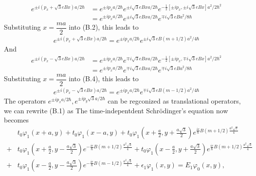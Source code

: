 \documentclass{report}
\newcommand{\f}[2]{\dfrac{#1}{#2}}
\begin{document}
\begin{equation}
	\begin{aligned}
		e^{\pm i(p_{x} + \sqrt{3} e B x) a / 2\hbar}
		 & = e^{\pm i p_{x} a / 2 \hbar} e^{\pm i\sqrt{3} e B x a / 2 \hbar} e^{-\frac{1}{2} \left[\pm i p_{x}, \pm i \sqrt{3} e B x\right] a^{2} / 2 \hbar^{2}} \\
		 & = e^{\pm i p_{x} a / 2 \hbar} e^{\pm i\sqrt{3} e B x a / 2 \hbar} e^{\mp i \sqrt{3} e B a^{2} / 8 \hbar}
	\end{aligned}
\end{equation}
Substituting $x = \f{ma}{2}$ into (B.2), this leads to
\begin{gather}
	e^{\pm i(p_{x} + \sqrt{3} e B x) a / 2\hbar}
	= e^{\pm i p_{x} a / 2 \hbar} e^{\pm i\sqrt{3} e B (m + 1 /2) a^{2} / 4 \hbar}
\end{gather}
And
\begin{equation}
	\begin{aligned}
		e^{\pm i(p_{x} - \sqrt{3} e B x) a / 2\hbar}
		 & = e^{\pm i p_{x} a / 2 \hbar} e^{\mp i\sqrt{3} e B x a / 2 \hbar} e^{-\frac{1}{2} \left[\pm i p_{x}, \mp i \sqrt{3} e B x\right] a^{2} / 2 \hbar^{2}} \\
		 & = e^{\pm i p_{x} a / 2 \hbar} e^{\mp i\sqrt{3} e B x a / 2 \hbar} e^{\mp i \sqrt{3} e B a^{2} / 8 \hbar}
	\end{aligned}
\end{equation}
Substituting $x = \f{ma}{2}$ into (B.4), this leads to
\begin{gather}
	e^{\pm i(p_{x} - \sqrt{3} e B x) a / 2\hbar}
	= e^{\pm i p_{x} a / 2 \hbar} e^{\mp i\sqrt{3} e B (m - 1 /2) a^{2} / 4 \hbar}
\end{gather}
The operators $e^{\pm i p_{x} a / 2 \hbar}, e^{\pm i p_{y} \sqrt{3}a / 2 \hbar}$ can be regconized as translational operators, we can rewrite (B.1) as
The time-indepentdent Schr\"{o}dinger's equation now becomes
\begin{equation}
	\begin{aligned}
		  & t_{0} \varphi_{1} (x + a,y) + t_{0}\varphi_{1} (x - a,y) + t_{0}\varphi_{1} (x + \frac{a}{2},y + \frac{a\sqrt{3}}{2}) e^{\frac{ie}{\hbar}B(m + 1 /2) \frac{a^{2}\sqrt{3}}{4}}                                                            \\
		+ & t_{0} \varphi_{1} (x + \frac{a}{2},y - \frac{a\sqrt{3}}{2}) e^{-\frac{ie}{\hbar}B(m + 1/2) \frac{a^{2}\sqrt{3}}{4}} + t_{0} \varphi_{1} (x - \frac{a}{2},y + \frac{a\sqrt{3}}{2}) e^{\frac{ie}{\hbar}B(m + 1/2) \frac{a^{2}\sqrt{3}}{4}} \\
		+ & t_{0} \varphi_{1} (x - \frac{a}{2},y - \frac{a\sqrt{3}}{2}) e^{-\frac{ie}{\hbar}B(m - 1/2) \frac{a^{2}\sqrt{3}}{4}} + \epsilon_{1} \varphi_{1}(x,y) = E_{1} \varphi_{0}(x,y),
	\end{aligned}
\end{equation}
\end{document}
